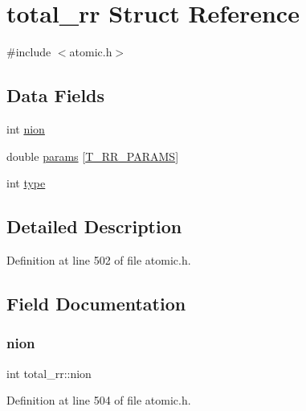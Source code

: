 \hypertarget{structtotal__rr}{}\section{total\+\_\+rr Struct Reference}
\label{structtotal__rr}


{\ttfamily \#include $<$atomic.\+h$>$}

\subsection*{Data Fields}
\begin{DoxyCompactItemize}
\item 
int \hyperlink{structtotal__rr_aa265b5651ab06ea43b7c227aa5c5e250}{nion}
\item 
double \hyperlink{structtotal__rr_a40e1e751bcd668ba0545af9c2f4da256}{params} \mbox{[}\hyperlink{atomic_8h_ae16cfc189f4a79641132b7f359cafbef}{T\+\_\+\+R\+R\+\_\+\+P\+A\+R\+A\+MS}\mbox{]}
\item 
int \hyperlink{structtotal__rr_af555b9f91044fdf1bf9c0203c2408d0e}{type}
\end{DoxyCompactItemize}


\subsection{Detailed Description}


Definition at line 502 of file atomic.\+h.



\subsection{Field Documentation}
\mbox{\label{structtotal__rr_aa265b5651ab06ea43b7c227aa5c5e250}} 
\subsubsection{\texorpdfstring{nion}{nion}}
{\footnotesize\ttfamily int total\+\_\+rr\+::nion}



Definition at line 504 of file atomic.\+h.

\mbox{\label{structtotal__rr_a40e1e751bcd668ba0545af9c2f4da256}} 
